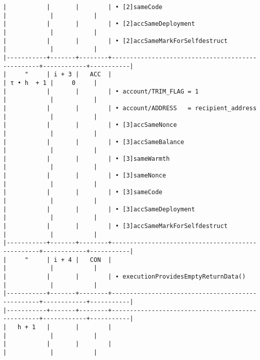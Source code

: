 \documentclass[varwidth=\maxdimen,margin=0.5cm,multi={verbatim}]{standalone}
\begin{document}
\begin{verbatim}
|           |       |        | • [2]sameCode                                    |            |           |
|           |       |        | • [2]accSameDeployment                           |            |           |
|           |       |        | • [2]accSameMarkForSelfdestruct                  |            |           |
|-----------+-------+--------+--------------------------------------------------+------------+-----------|
|     "     | i + 3 |   ACC  |                                                  | τ • h  + 1 |     0     |
|           |       |        | • account/TRIM_FLAG = 1                          |            |           |
|           |       |        | • account/ADDRESS   = recipient_address          |            |           |
|           |       |        | • [3]accSameNonce                                |            |           |
|           |       |        | • [3]accSameBalance                              |            |           |
|           |       |        | • [3]sameWarmth                                  |            |           |
|           |       |        | • [3]sameNonce                                   |            |           |
|           |       |        | • [3]sameCode                                    |            |           |
|           |       |        | • [3]accSameDeployment                           |            |           |
|           |       |        | • [3]accSameMarkForSelfdestruct                  |            |           |
|-----------+-------+--------+--------------------------------------------------+------------+-----------|
|     "     | i + 4 |   CON  |                                                  |            |           |
|           |       |        | ∙ executionProvidesEmptyReturnData()             |            |           |
|-----------+-------+--------+--------------------------------------------------+------------+-----------|
|-----------+-------+--------+--------------------------------------------------+------------+-----------|
|   h + 1   |       |        |                                                  |            |           |
|           |       |        |                                                  |            |           |
\end{verbatim}
\end{document}
